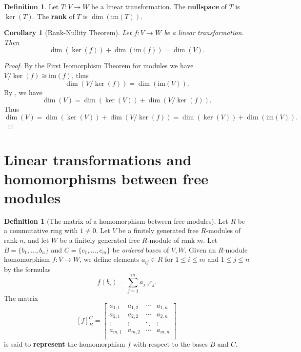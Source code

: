 \documentclass[12pt]{report}
\newtheorem{corollary}[theorem]{Corollary}
\numberwithin{equation}{section}
\numberwithin{theorem}{chapter}
\theoremstyle{definition}
\newtheorem{definition}[theorem]{Definition}
\newtheorem*{basic properties}{Basic Properties}
\newtheorem*{Important Remark}{Important Remark}
\newcommand{\df}[1]{{\bf #1}\index{#1}}
\renewcommand{\ker}{\operatorname{ker}}
\begin{document}
\begin{definition} 
Let $T\!: V \to W$ be a linear transformation. The \df{nullspace} of $T$ is $\ker(T)$. The \df{rank} of $T$ is $\dim(\mathrm{im}(T))$. 
 \end{definition}

 
 \begin{corollary}[Rank-Nullity Theorem]\label{rank nulity}
 Let $f\!: V \to W$ be a linear transformation. Then 
 $$\dim(\ker(f)) + \dim(\mathrm{im}(f)) = \dim(V).$$
 \end{corollary} 
 
\begin{proof}
 By the \hyperref[first iso thm]{First Isomorphism Theorem for modules} we have $V/\ker(f)\cong\mathrm{im}(f)$, thus 
 $$\dim\left(V/\ker(f)\right)=\dim(\mathrm{im}(V)).$$ 
 By , we have 
 $$\dim(V)=\dim(\ker(V))+\dim\left(V/\ker(f)\right).$$
 Thus
$$\dim(V)=\dim(\ker(V))+\dim\left(V/\ker(f)\right) = \dim(\ker(V)) + \dim(\mathrm{im}(V)).$$ 
\end{proof}




 
\section{Linear transformations and homomorphisms between free modules}



\begin{definition}[The matrix of a homomorphism between free modules] 
Let $R$ be a commutative ring with $1\neq 0$.
Let $V$ be a finitely generated free $R$-modules of rank $n$, and let $W$ be a finitely generated free $R$-module of rank $m$. Let $B=\{b_1, \dots, b_n\}$ and $C=\{c_1, \dots, c_m\}$ be {\em ordered} bases of $V,W$. 
Given an $R$-module homomorphism $f: V \to W$, we define elements $a_{ij}\in R$ for $1 \leqslant i \leqslant m$ and $1 \leqslant j \leqslant n$ by the formulas
\begin{equation}\label{eq:aij}
f(b_i) = \sum_{j=1}^m a_{j,i} c_j. 
\end{equation}
The matrix
$$[f]_B^C= 
\begin{bmatrix}
a_{1,1} & a_{1,2} & \cdots & a_{1,n} \\
a_{2,1} & a_{2,2} & \cdots & a_{2,n} \\
\vdots & \vdots & \ddots & \vdots \\
a_{m,1} & a_{m,2} & \cdots & a_{m,n} \\
\end{bmatrix}$$
is said to \df{represent} the homomorphism $f$ with respect to the bases $B$ and $C$.
\end{definition}
\end{document}
